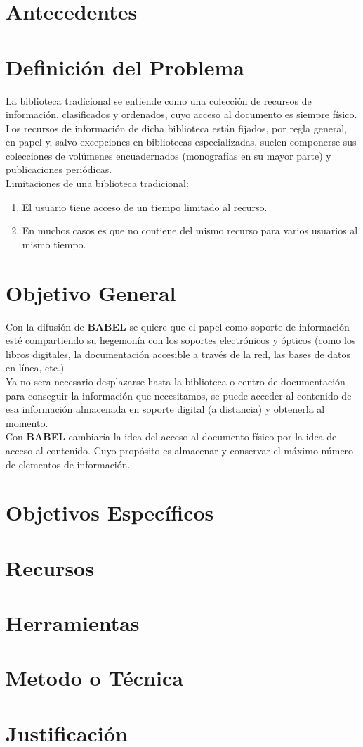 \documentclass[letter,12pt]{article}
\begin{document}
\section{Antecedentes}

\section{Definición del Problema}
La biblioteca tradicional se entiende como una colección de recursos de información, clasificados y ordenados, cuyo acceso al documento es siempre físico. Los recursos de información de dicha biblioteca están fijados, por regla general, en papel y, salvo excepciones en bibliotecas especializadas, suelen componerse sus colecciones de volúmenes encuadernados (monografías en su mayor parte) y publicaciones periódicas.\\
Limitaciones de una biblioteca tradicional:
\begin{enumerate}
\item El usuario tiene acceso de un tiempo limitado al recurso.
\item En muchos casos es que no contiene del mismo recurso para varios usuarios al mismo tiempo.
\end{enumerate} 

\section{Objetivo General}
Con la difusión de {\bf BABEL} se quiere que el papel como soporte de información esté compartiendo su hegemonía con los soportes electrónicos y ópticos (como los libros digitales, la documentación accesible a través de la red, las bases de datos en línea, etc.)\\
Ya no sera necesario desplazarse hasta la biblioteca o centro de documentación para conseguir la información que necesitamos, se puede acceder al contenido de esa información
almacenada en soporte digital (a distancia) y obtenerla al momento.\\
Con {\bf BABEL} cambiaría la idea del acceso al documento físico por la idea de acceso al contenido. Cuyo propósito es almacenar y conservar el máximo número de elementos de información.
\section{Objetivos Específicos}

\section{Recursos}

\section{Herramientas}

\section{Metodo o Técnica}

\section{Justificación}
\end{document}
